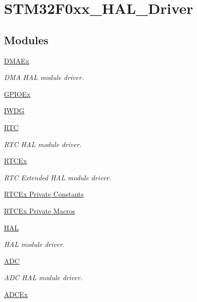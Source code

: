 \hypertarget{group___s_t_m32_f0xx___h_a_l___driver}{}\section{S\+T\+M32\+F0xx\+\_\+\+H\+A\+L\+\_\+\+Driver}
\label{group___s_t_m32_f0xx___h_a_l___driver}
\subsection*{Modules}
\begin{DoxyCompactItemize}
\item 
\hyperlink{group___d_m_a_ex}{D\+M\+A\+Ex}
\begin{DoxyCompactList}\small\item\em D\+MA H\+AL module driver. \end{DoxyCompactList}\item 
\hyperlink{group___g_p_i_o_ex}{G\+P\+I\+O\+Ex}
\item 
\hyperlink{group___i_w_d_g}{I\+W\+DG}
\item 
\hyperlink{group___r_t_c}{R\+TC}
\begin{DoxyCompactList}\small\item\em R\+TC H\+AL module driver. \end{DoxyCompactList}\item 
\hyperlink{group___r_t_c_ex}{R\+T\+C\+Ex}
\begin{DoxyCompactList}\small\item\em R\+TC Extended H\+AL module driver. \end{DoxyCompactList}\item 
\hyperlink{group___r_t_c_ex___private___constants}{R\+T\+C\+Ex Private Constants}
\item 
\hyperlink{group___r_t_c_ex___private___macros}{R\+T\+C\+Ex Private Macros}
\item 
\hyperlink{group___h_a_l}{H\+AL}
\begin{DoxyCompactList}\small\item\em H\+AL module driver. \end{DoxyCompactList}\item 
\hyperlink{group___a_d_c}{A\+DC}
\begin{DoxyCompactList}\small\item\em A\+DC H\+AL module driver. \end{DoxyCompactList}\item 
\hyperlink{group___a_d_c_ex}{A\+D\+C\+Ex}

\end{DoxyCompactItemize}
